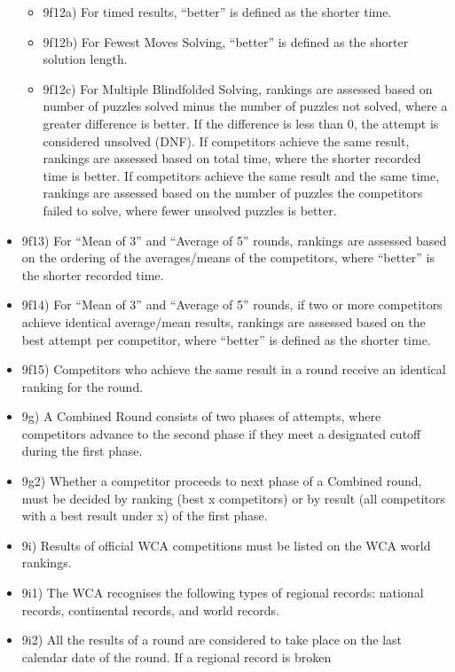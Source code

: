 \begin{itemize}
  \begin{itemize}
  \item
    9f12a) For timed results, ``better'' is defined as the shorter time.
  \item
    9f12b) For Fewest Moves Solving, ``better'' is defined as the
    shorter solution length.
  \item
    9f12c) For Multiple Blindfolded Solving, rankings are assessed based
    on number of puzzles solved minus the number of puzzles not solved,
    where a greater difference is better. If the difference is less than
    0, the attempt is considered unsolved (DNF). If competitors achieve
    the same result, rankings are assessed based on total time, where
    the shorter recorded time is better. If competitors achieve the same
    result and the same time, rankings are assessed based on the number
    of puzzles the competitors failed to solve, where fewer unsolved
    puzzles is better.
  \end{itemize}
\item
  9f13) For ``Mean of 3'' and ``Average of 5'' rounds, rankings are
  assessed based on the ordering of the averages/means of the
  competitors, where ``better'' is the shorter recorded time.
\item
  9f14) For ``Mean of 3'' and ``Average of 5'' rounds, if two or more
  competitors achieve identical average/mean results, rankings are
  assessed based on the best attempt per competitor, where ``better'' is
  defined as the shorter time.
\item
  9f15) Competitors who achieve the same result in a round receive an
  identical ranking for the round.
\item
  9g) A Combined Round consists of two phases of attempts, where
  competitors advance to the second phase if they meet a designated
  cutoff during the first phase.
\item
  9g2) Whether a competitor proceeds to next phase of a Combined round,
  must be decided by ranking (best x competitors) or by result (all
  competitors with a best result under x) of the first phase.
\item
  9i) Results of official WCA competitions must be listed on the WCA
  world rankings.
\item
  9i1) The WCA recognises the following types of regional records:
  national records, continental records, and world records.
\item
  9i2) All the results of a round are considered to take place on the
  last calendar date of the round. If a regional record is broken

\end{itemize}

